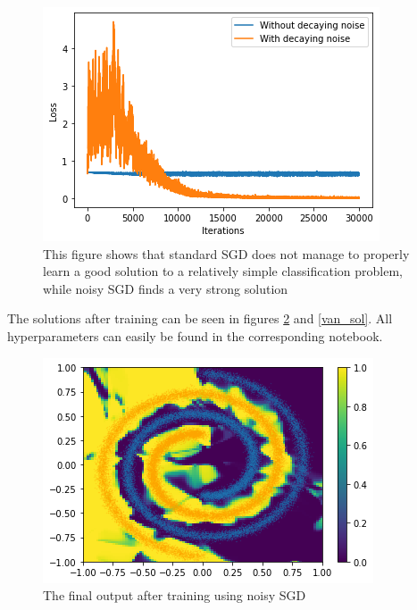 \documentclass[twocolumn]{article}
\begin{document}
\begin{figure}[ht!]
\begin{center}
  \centerline{\includegraphics[width=\columnwidth]{src/loss.png}}
  \caption{This figure shows that standard SGD does not manage to properly learn a good solution to a relatively simple classification problem, while noisy SGD finds a very strong solution}
  \label{loss}
\end{center}
\vskip -0.2in
\end{figure}

The solutions after training can be seen in figures \ref{noisy_sol} and \ref{van_sol}. All hyperparameters can easily be found in the corresponding notebook.

\begin{figure}[ht!]
\begin{center}
  \centerline{\includegraphics[width=\columnwidth]{src/noise_sol.png}}
  \caption{The final output after training using noisy SGD}
  \label{noisy_sol}
\end{center}
\vskip -0.2in
\end{figure}
\end{document}
